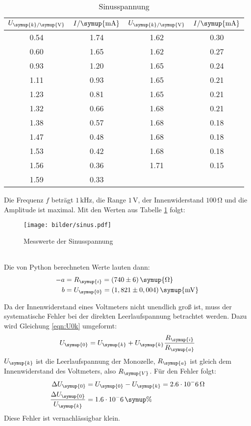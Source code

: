 \begin{table}[H]
  \centering
  \begin{tabular}{c c c c}
    \toprule
    $U_{\symup{k}/\symup{\si{\volt}}}$ & $I/\symup{\si{\milli\ampere}}$  &
    $U_{\symup{k}/\symup{\si{\volt}}}$ & $I/\symup{\si{\milli\ampere}}$  \\
    \midrule
    0.54   &  1.74  &  1.62  &  0.30  \\
    0.60   &  1.65  &  1.62  &  0.27  \\
    0.93   &  1.20  &  1.65  &  0.24  \\
    1.11   &  0.93  &  1.65  &  0.21  \\
    1.23   &  0.81  &  1.65  &  0.21  \\
    1.32   &  0.66  &  1.68  &  0.21  \\
    1.38   &  0.57  &  1.68  &  0.18  \\
    1.47   &  0.48  &  1.68  &  0.18  \\
    1.53   &  0.42  &  1.68  &  0.18  \\
    1.56   &  0.36  &  1.71  &  0.15  \\
    1.59   &  0.33  &  \hrulefill  & \hrulefill  \\
    \bottomrule
  \end{tabular}
  \caption{Sinusspannung}
  \label{tab:sin}
\end{table}
Die Frequenz $f$ beträgt $1\,\si{\kilo\hertz}$, die Range $1\,\si{\volt}$, der
Innenwiderstand $100\,\si{\ohm}$ und die Amplitude ist maximal.
Mit den Werten aus Tabelle \ref{tab:sin} folgt:
\begin{figure}[h]
  \centering
  \texttt{[image: bilder/sinus.pdf]}
  \caption{Messwerte der Sinusspannung}
  \label{fig:si}
\end{figure}
\\
Die von Python berechneten Werte lauten dann:
\begin{align*}
   -a &= R_\symup{i} = (740 \pm 6)\, \symup{\si{\ohm}} \\
   b &= U_\symup{0} = (1,821 \pm 0,004)\,\symup{\si{\milli\volt}}
\end{align*}

Da der Innenwiderstand eines Voltmeters nicht unendlich groß ist, muss der systematische
Fehler bei der direkten Leerlaufspannung betrachtet werden. Dazu wird Gleichung
\eqref{eqn:U0k} umgeformt:
\begin{equation}
  U_\symup{0} = U_\symup{k} + U_\symup{k} \frac{R_\symup{i}}{R_\symup{a}}
\end{equation}
$U_\symup{k}$ ist die Leerlaufspannung der Monozelle, $R_\symup{a}$ ist gleich dem
Innenwiderstand des Voltmeters, also $R_\symup{V}$.
Für den Fehler folgt:
\begin{align*}
  \Delta U_\symup{0} &= U_\symup{0} - U_\symup{k} = 2.6 \cdot 10^-6 \,\si{\ohm} \\
  \frac{\Delta U_\symup{0}}{U_\symup{k}} &= 1.6 \cdot 10^-6 \, \symup{\%}
\end{align*}
Diese Fehler ist vernachlässigbar klein.

